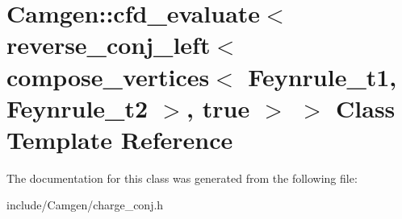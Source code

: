 \hypertarget{a00058}{}\section{Camgen\+:\+:cfd\+\_\+evaluate$<$ reverse\+\_\+conj\+\_\+left$<$ compose\+\_\+vertices$<$ Feynrule\+\_\+t1, Feynrule\+\_\+t2 $>$, true $>$ $>$ Class Template Reference}
\label{a00058}


The documentation for this class was generated from the following file\+:\begin{DoxyCompactItemize}
\item 
include/\+Camgen/charge\+\_\+conj.\+h\end{DoxyCompactItemize}
